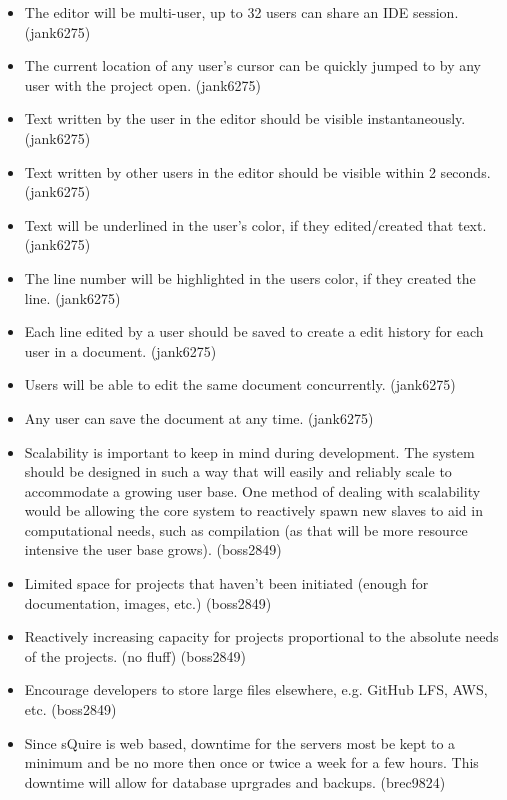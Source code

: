 \documentclass[11pt]{report}
\begin{document}
    \begin{itemize}
            \item The editor will be multi-user, up to 32 users can share an IDE session. (jank6275)
            \item The current location of any user's cursor can be quickly jumped to by any user with the project open. (jank6275)
            \item Text written by the user in the editor should be visible instantaneously. (jank6275)
            \item Text written by other users in the editor should be visible within 2 seconds. (jank6275)
            \item Text will be underlined in the user's color, if they edited/created that text. (jank6275)
            \item The line number will be highlighted in the users color, if they created the line. (jank6275)
            \item Each line edited by a user should be saved to create a edit history for each user in a document. (jank6275)
            \item Users will be able to edit the same document concurrently. (jank6275)
            \item Any user can save the document at any time. (jank6275)
            \item Scalability is important to keep in mind during development. The system should be designed in such a way that will easily and reliably scale to accommodate a growing user base. One method of dealing with scalability would be allowing the core system to reactively spawn new slaves to aid in computational needs, such as compilation (as that will be more resource intensive the user base grows). (boss2849)
            \item Limited space for projects that haven't been initiated (enough for documentation, images, etc.) (boss2849)
            \item Reactively increasing capacity for projects proportional to the absolute needs of the projects. (no fluff) (boss2849)
            \item Encourage developers to store large files elsewhere, e.g. GitHub LFS, AWS, etc. (boss2849)
            \item Since sQuire is web based, downtime for the servers most be kept to a minimum and be no more then once or twice a week for a few hours. This downtime will allow for database uprgrades and backups. (brec9824)

\end{itemize}
\end{document}
